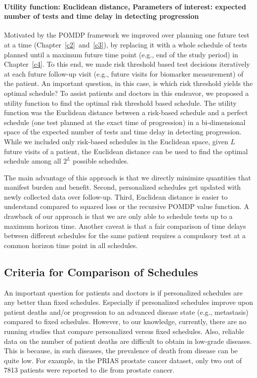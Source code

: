 \paragraph{Utility function: Euclidean distance, Parameters of interest: expected number of tests and time delay in detecting progression} Motivated by the POMDP framework we improved over planning one future test at a time (Chapter~\ref{c2}~and~\ref{c3}), by replacing it with a whole schedule of tests planned until a maximum future time point (e.g., end of the study period) in Chapter~\ref{c4}. To this end, we made risk threshold based test decisions iteratively at each future follow-up visit (e.g., future visits for biomarker measurement) of the patient. An important question, in this case, is which risk threshold yields the optimal schedule? To assist patients and doctors in this endeavor, we proposed a utility function to find the optimal risk threshold based schedule. The utility function was the Euclidean distance between a risk-based schedule and a perfect schedule (one test planned at the exact time of progression) in a bi-dimensional space of the expected number of tests and time delay in detecting progression. While we included only risk-based schedules in the Euclidean space, given $L$ future visits of a patient, the Euclidean distance can be used to find the optimal schedule among all $2^L$ possible schedules.

The main advantage of this approach is that we directly minimize quantities that manifest burden and benefit. Second, personalized schedules get updated with newly collected data over follow-up. Third, Euclidean distance is easier to understand compared to squared loss or the recursive POMDP value function. A drawback of our approach is that we are only able to schedule tests up to a maximum horizon time. Another caveat is that a fair comparison of time delays between different schedules for the same patient requires a compulsory test at a common horizon time point in all schedules.

\subsection{Criteria for Comparison of Schedules}
An important question for patients and doctors is if personalized schedules are any better than fixed schedules. Especially if personalized schedules improve upon patient deaths and/or progression to an advanced disease state (e.g., metastasis) compared to fixed schedules. However, to our knowledge, currently, there are no running studies that compare personalized versus fixed schedules. Also, reliable data on the number of patient deaths are difficult to obtain in low-grade diseases. This is because, in such diseases, the prevalence of death from disease can be quite low. For example, in the PRIAS prostate cancer dataset, only two out of 7813 patients were reported to die from prostate cancer.


